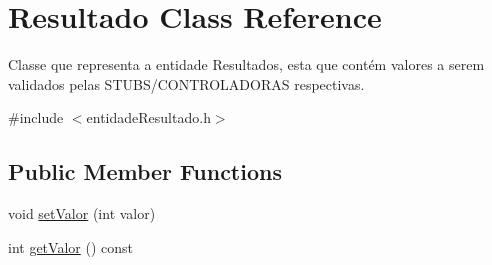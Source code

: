 \hypertarget{classResultado}{}\section{Resultado Class Reference}
\label{classResultado}


Classe que representa a entidade Resultados, esta que contém valores a serem validados pelas S\+T\+U\+B\+S/\+C\+O\+N\+T\+R\+O\+L\+A\+D\+O\+R\+AS respectivas.  




{\ttfamily \#include $<$entidade\+Resultado.\+h$>$}

\subsection*{Public Member Functions}
\begin{DoxyCompactItemize}
\item 
void \hyperlink{classResultado_ab0c3c0ed280eefb95e89d90dc7e239e2}{set\+Valor} (int valor)
\item 
int \hyperlink{classResultado_a029dc1436d6ed7963b5b90400e972e15}{get\+Valor} () const
\end{DoxyCompactItemize}
